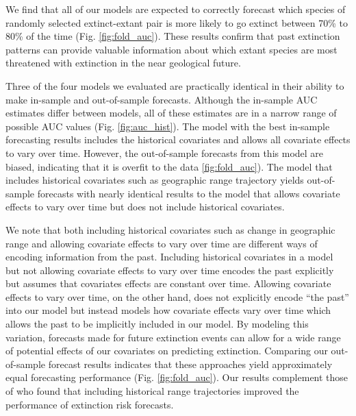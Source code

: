 \documentclass[12pt,letterpaper]{article}
\begin{document}
\begin{refsection}
We find that all of our models are expected to correctly forecast which species of randomly selected extinct-extant pair is more likely to go extinct between 70\% to 80\% of the time (Fig. \ref{fig:fold_auc}). These results confirm that past extinction patterns can provide valuable information about which extant species are most threatened with extinction in the near geological future.

Three of the four models we evaluated are practically identical in their ability to make in-sample and out-of-sample forecasts. Although the in-sample AUC estimates differ between models, all of these estimates are in a narrow range of possible AUC values (Fig. \ref{fig:auc_hist}). The model with the best in-sample forecasting results includes the historical covariates and allows all covariate effects to vary over time. However, the out-of-sample forecasts from this model are biased, indicating that it is overfit to the data \ref{fig:fold_auc}). The model that includes historical covariates such as geographic range trajectory yields out-of-sample forecasts with nearly identical results to the model that allows covariate effects to vary over time but does not include historical covariates. 

We note that both including historical covariates such as change in geographic range and allowing covariate effects to vary over time are different ways of encoding information from the past. Including historical covariates in a model but not allowing covariate effects to vary over time encodes the past explicitly but assumes that covariates effects are constant over time. Allowing covariate effects to vary over time, on the other hand, does not explicitly encode ``the past'' into our model but instead models how covariate effects vary over time which allows the past to be implicitly included in our model. By modeling this variation, forecasts made for future extinction events can allow for a wide range of potential effects of our covariates on predicting extinction. Comparing our out-of-sample forecast results indicates that these approaches yield approximately equal forecasting performance (Fig. \ref{fig:fold_auc}). Our results complement those of \citet{Kiessling2016} who found that including historical range trajectories improved the performance of extinction risk forecasts.


\end{refsection}
\end{document}
